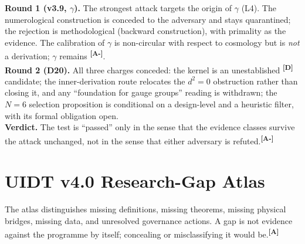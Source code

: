 \documentclass[12pt,a4paper,twoside]{article}
\theoremstyle{plain}
\theoremstyle{definition}
\theoremstyle{remark}
\newcommand{\catmark}[1]{\textsuperscript{\textsf{\textbf{[#1]}}}}
\begin{document}
\begin{governancebox}
\textbf{Round 1 (v3.9, $\gamma$).} The strongest attack targets the
origin of $\gamma$ (L4). The numerological construction is conceded to
the adversary and stays quarantined; the rejection is methodological
(backward construction), with primality as the evidence. The calibration
of $\gamma$ is non-circular with respect to cosmology but is \emph{not} a
derivation; $\gamma$ remains \catmark{A-}.\\[0.35em]
\textbf{Round 2 (D20).} All three charges conceded: the kernel is an
unestablished \catmark{D} candidate; the inner-derivation route relocates
the $d^2=0$ obstruction rather than closing it, and any ``foundation for
gauge groups'' reading is withdrawn; the $N=6$ selection proposition is
conditional on a design-level and a heuristic filter, with its formal
obligation open.\\[0.35em]
\textbf{Verdict.} The test is ``passed'' only in the sense that the
evidence classes survive the attack unchanged, not in the sense that
either adversary is refuted.\catmark{A-}
\end{governancebox}




\section{UIDT v4.0 Research-Gap Atlas}
\label{sec:ctx-v4-gap-atlas}

The atlas distinguishes missing definitions, missing theorems, missing
physical bridges, missing data, and unresolved governance actions. A gap is
not evidence against the programme by itself; concealing or misclassifying it
would be.\catmark{A}
\end{document}
